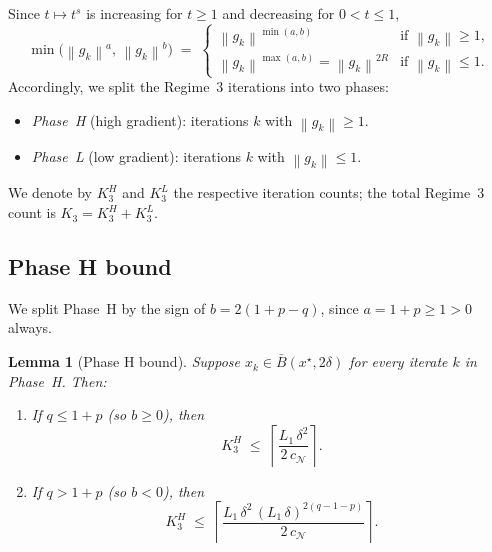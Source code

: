 \documentclass[11pt,a4paper]{article}
\theoremstyle{plain}
\newtheorem{lemma}{Lemma}
\theoremstyle{definition}
\newcommand{\norm}[1]{\left\|#1\right\|}
\newcommand{\xstar}{x^{\star}}
\newcommand{\Lone}{L_{1}}
\newcommand{\setN}{\mathcal{N}}
\newcommand{\cN}{c_{\setN}}
\begin{document}
Since $t \mapsto t^{s}$ is increasing for $t \geq 1$ and decreasing for $0 < t \leq 1$,
\begin{equation}\label{eq:r3-min-resolved}
\min\!\bigl(\norm{g_{k}}^{a},\, \norm{g_{k}}^{b}\bigr)
\;=\;
\begin{cases}
\norm{g_{k}}^{\min(a,b)} & \text{if } \norm{g_{k}} \geq 1, \\[2pt]
\norm{g_{k}}^{\max(a,b)} = \norm{g_{k}}^{2R} & \text{if } \norm{g_{k}} \leq 1.
\end{cases}
\end{equation}
Accordingly, we split the Regime~3 iterations into two phases:
\begin{itemize}[leftmargin=2.5em]
  \item \emph{Phase~H} (high gradient): iterations $k$ with $\norm{g_{k}} \geq 1$.
  \item \emph{Phase~L} (low gradient): iterations $k$ with $\norm{g_{k}} \leq 1$.
\end{itemize}
We denote by $K_{3}^{H}$ and $K_{3}^{L}$ the respective iteration counts; the total Regime~3 count is $K_{3} = K_{3}^{H} + K_{3}^{L}$.

\subsection{Phase H bound}\label{subsec:r3-phaseH}

We split Phase~H by the sign of $b = 2(1+p-q)$, since $a = 1+p \geq 1 > 0$ always.

\begin{lemma}[Phase H bound]\label{lem:r3-phaseH}
Suppose $x_{k} \in \bar B(\xstar, 2\delta)$ for every iterate $k$ in Phase~H. Then:
\begin{enumerate}[label=(\roman*), leftmargin=2.5em]
  \item If $q \leq 1+p$ (so $b \geq 0$), then
  \begin{equation}\label{eq:r3-phaseH-i}
  K_{3}^{H} \;\leq\; \left\lceil \frac{\Lone\,\delta^{2}}{2\,\cN} \right\rceil.
  \end{equation}
  \item If $q > 1+p$ (so $b < 0$), then
  \begin{equation}\label{eq:r3-phaseH-ii}
  K_{3}^{H} \;\leq\; \left\lceil \frac{\Lone\,\delta^{2}\,(\Lone\,\delta)^{2(q-1-p)}}{2\,\cN} \right\rceil.
  \end{equation}
\end{enumerate}
\end{lemma}
\end{document}
